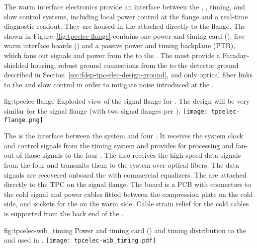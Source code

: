 The warm interface electronics %
provide an interface between the , , timing, and slow control systems, including local power control at the flange and a real-time diagnostic readout. They are housed in the  attached directly to the  flange.  The  shown in Figure~\ref{fig:tpcelec-flange} 
contains one power and timing card (), five warm interface boards () and a passive
power and timing backplane (PTB), which fans out signals and  power from the  to the . The  must provide a Faraday-shielded housing, robust ground connections from the  to the detector ground described in Section~\ref{sec:fdsp-tpc-elec-design-ground}, and only optical fiber links to the  and slow control in order to mitigate noise introduced at the  \fdth.


\begin{dunefigure}
{fig:tpcelec-flange}
{Exploded view of the  signal flange for .  The design will be very similar for the   signal flange (with two  signal flanges per \fdth).}
\texttt{[image: tpcelec-flange.png]}
\end{dunefigure}

The  is the interface between the  system and four
. It receives the system clock and control signals from the
timing system and provides for processing and fan-out of those signals to the four
. The  also receives the high-speed data signals from the four 
 and transmits them to the  system over optical
fibers. The data signals are recovered onboard the  with commercial equalizers.
The  are attached directly to the TPC
 \fdth on the signal flange. The \fdth
board is a PCB with connectors to the cold signal and  power cables fitted
between the compression plate on the cold side, and sockets for
the  on the warm side. Cable strain relief for the cold cables is 
supported from the back end of the \fdth.

\begin{dunefigure}
{fig:tpcelec-wib_timing}
{Power and timing card () and timing distribution to the  and  used in .}
\texttt{[image: tpcelec-wib\_timing.pdf]}
\end{dunefigure}

